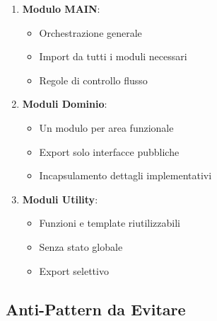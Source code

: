 \begin{enumerate}
\item \textbf{Modulo MAIN}:
   \begin{itemize}
   \item Orchestrazione generale
   \item Import da tutti i moduli necessari
   \item Regole di controllo flusso
   \end{itemize}

\item \textbf{Moduli Dominio}:
   \begin{itemize}
   \item Un modulo per area funzionale
   \item Export solo interfacce pubbliche
   \item Incapsulamento dettagli implementativi
   \end{itemize}

\item \textbf{Moduli Utility}:
   \begin{itemize}
   \item Funzioni e template riutilizzabili
   \item Senza stato globale
   \item Export selettivo
   \end{itemize}
\end{enumerate}

\subsection{Anti-Pattern da Evitare}

